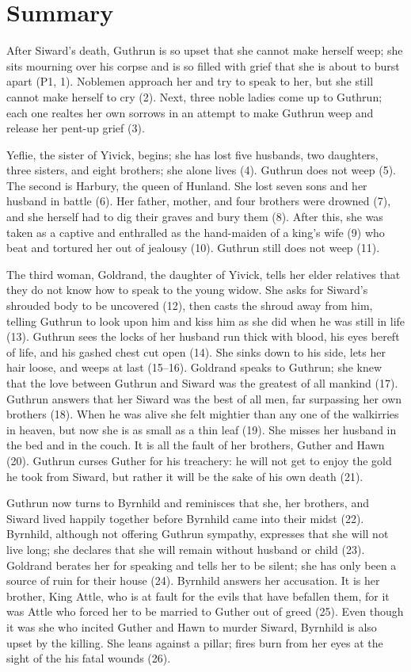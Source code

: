 \section{Summary}

After Siward’s death, Guthrun is so upset that she cannot make herself weep; she sits mourning over his corpse and is so filled with grief that she is about to burst apart (P1, 1).  Noblemen approach her and try to speak to her, but she still cannot make herself to cry (2).  Next, three noble ladies come up to Guthrun; each one realtes her own sorrows in an attempt to make Guthrun weep and release her pent-up grief (3).

Yeflie, the sister of Yivick, begins; she has lost five husbands, two daughters, three sisters, and eight brothers; she alone lives (4).  Guthrun does not weep (5).  The second is Harbury, the queen of Hunland.  She lost seven sons and her husband in battle (6).  Her father, mother, and four brothers were drowned (7), and she herself had to dig their graves and bury them (8).  After this, she was taken as a captive and enthralled as the hand-maiden of a king’s wife (9) who beat and tortured her out of jealousy (10).  Guthrun still does not weep (11).

The third woman, Goldrand, the daughter of Yivick, tells her elder relatives that they do not know how to speak to the young widow.  She asks for Siward’s shrouded body to be uncovered (12), then casts the shroud away from him, telling Guthrun to look upon him and kiss him as she did when he was still in life (13).  Guthrun sees the locks of her husband run thick with blood, his eyes bereft of life, and his gashed chest cut open (14).  She sinks down to his side, lets her hair loose, and weeps at last (15--16).  Goldrand speaks to Guthrun; she knew that the love between Guthrun and Siward was the greatest of all mankind (17).  Guthrun answers that her Siward was the best of all men, far surpassing her own brothers (18).  When he was alive she felt mightier than any one of the walkirries in heaven, but now she is as small as a thin leaf (19).  She misses her husband in the bed and in the couch.  It is all the fault of her brothers, Guther and Hawn (20).  Guthrun curses Guther for his treachery: he will not get to enjoy the gold he took from Siward, but rather it will be the sake of his own death (21).

Guthrun now turns to Byrnhild and reminisces that she, her brothers, and Siward lived happily together before Byrnhild came into their midst (22).  Byrnhild, although not offering Guthrun sympathy, expresses that she will not live long; she declares that she will remain without husband or child (23).  Goldrand berates her for speaking and tells her to be silent; she has only been a source of ruin for their house (24).  Byrnhild answers her accusation.  It is her brother, King Attle, who is at fault for the evils that have befallen them, for it was Attle who forced her to be married to Guther out of greed (25).  Even though it was she who incited Guther and Hawn to murder Siward, Byrnhild is also upset by the killing.  She leans against a pillar; fires burn from her eyes at the sight of the his fatal wounds (26).

